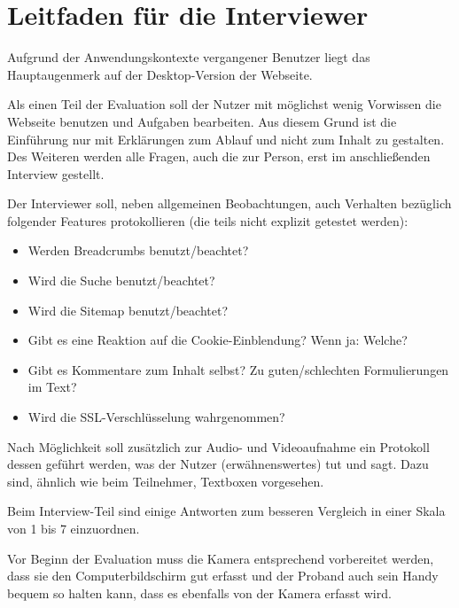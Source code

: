 \section{Leitfaden für die Interviewer}
Aufgrund der Anwendungskontexte vergangener Benutzer liegt das Hauptaugenmerk auf der Desktop-Version der Webseite.

Als einen Teil der Evaluation soll der Nutzer mit möglichst wenig Vorwissen die Webseite benutzen und Aufgaben bearbeiten. Aus diesem Grund ist die Einführung nur mit Erklärungen zum Ablauf und nicht zum Inhalt zu gestalten. Des Weiteren werden alle Fragen, auch die zur Person, erst im anschließenden Interview gestellt.

Der Interviewer soll, neben allgemeinen Beobachtungen, auch Verhalten bezüglich folgender Features protokollieren (die teils nicht explizit getestet werden):
\begin{itemize}
\item Werden Breadcrumbs benutzt/beachtet?
\item Wird die Suche benutzt/beachtet?
\item Wird die Sitemap benutzt/beachtet?
\item Gibt es eine Reaktion auf die Cookie-Einblendung? Wenn ja: Welche?
\item Gibt es Kommentare zum Inhalt selbst? Zu guten/schlechten Formulierungen im Text?
\item Wird die SSL-Verschlüsselung wahrgenommen?
\end{itemize}

Nach Möglichkeit soll zusätzlich zur Audio- und Videoaufnahme ein Protokoll dessen geführt werden, was der Nutzer (erwähnenswertes) tut und sagt. Dazu sind, ähnlich wie beim Teilnehmer, Textboxen vorgesehen.

Beim Interview-Teil sind einige Antworten zum besseren Vergleich in einer Skala von 1 bis 7 einzuordnen.

Vor Beginn der Evaluation muss die Kamera entsprechend vorbereitet werden, dass sie den Computerbildschirm gut erfasst und der Proband auch sein Handy bequem so halten kann, dass es ebenfalls von der Kamera erfasst wird.